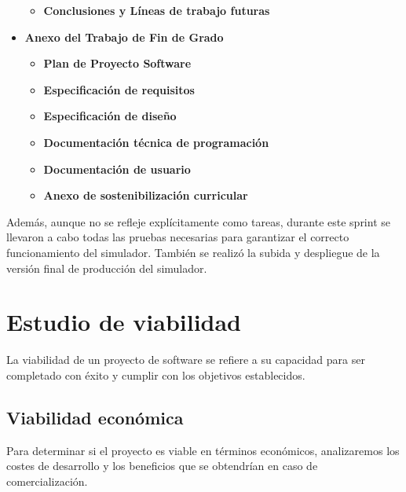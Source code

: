 \begin{itemize}
\begin{itemize}
        \item \textbf{Conclusiones y Líneas de trabajo futuras}
    \end{itemize}
    \item \textbf{Anexo del Trabajo de Fin de Grado}
    \begin{itemize}
        \item \textbf{Plan de Proyecto Software}
        \item \textbf{Especificación de requisitos}
        \item \textbf{Especificación de diseño}
        \item \textbf{Documentación técnica de programación}
        \item \textbf{Documentación de usuario}
        \item \textbf{Anexo de sostenibilización curricular}
    \end{itemize}
\end{itemize}

Además, aunque no se refleje explícitamente como tareas, durante este sprint se llevaron a cabo todas las pruebas necesarias para garantizar el correcto funcionamiento del simulador. También se realizó la subida y despliegue de la versión final de producción del simulador.


\section{Estudio de viabilidad}
\label{sec:Viabilidad}
La viabilidad de un proyecto de software se refiere a su capacidad para ser completado con éxito y cumplir con los objetivos establecidos.

\subsection{Viabilidad económica}
\label{subsec:Economico}
Para determinar si el proyecto es viable en términos económicos, analizaremos los costes de desarrollo y los beneficios que se obtendrían en caso de comercialización.

